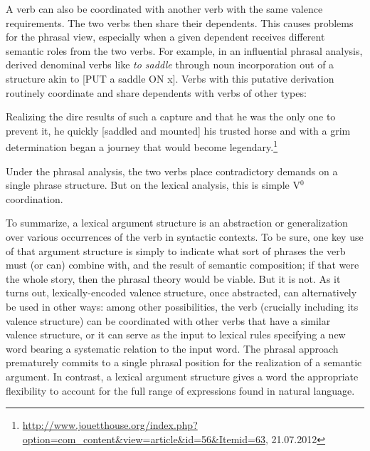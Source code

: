 \documentclass[output=paper
                ,modfonts
                ,nonflat
	        ,collection
	        ,collectionchapter
	        ,collectiontoclongg
 	        ,biblatex
                ,babelshorthands
                ,newtxmath
                ,draftmode
                ,colorlinks, citecolor=brown
]{./langsci/langscibook}
\begin{document}
A verb can also be coordinated with another verb with the same valence requirements.  The two verbs then share their dependents.  This causes problems for the phrasal view, especially when a given dependent receives different semantic roles from the two verbs.  For example, in an influential phrasal analysis, \citet{hale+keyser:1993}
derived denominal verbs like \textit{to saddle} through noun incorporation out of a structure akin to
[PUT a saddle ON x].  Verbs with this putative derivation routinely coordinate and share
dependents with verbs of other types: 

\begin{exe}
\ex Realizing the dire results of such a capture and that he was the only one to prevent it, he quickly
[saddled and mounted] his trusted horse and with a grim determination began a journey that would
become legendary.\footnote{\url{http://www.jouetthouse.org/index.php?option=com_content&view=article&id=56&Itemid=63},
  21.07.2012}  
\end{exe}

\noindent
Under the phrasal analysis, the two verbs place contradictory demands on a single phrase structure.  But on the lexical analysis, this is simple V$^0$ coordination.   
 
To summarize, a lexical argument structure is an abstraction or generalization over various occurrences of the verb in syntactic contexts. To be sure, one key use of that argument structure is simply to indicate what sort of phrases the verb must (or can) combine with, and the result of semantic composition; if that were the whole story, then the phrasal theory would be viable. But it is not. As it turns out, lexically-encoded valence structure, once abstracted, can alternatively be used in other ways: among other possibilities, the verb (crucially including its valence structure) can be coordinated with other verbs that have a similar valence structure, or it can serve as the input to lexical rules specifying a new word bearing a systematic relation to the input word.   The phrasal approach prematurely commits to a single phrasal position for the realization of 
a semantic argument.  In contrast, a lexical argument structure gives a word the appropriate flexibility to account for the full range of expressions found in natural language.   
 


%
{\sloppy
\printbibliography[heading=subbibliography,notkeyword=this] 
}
\end{document}

